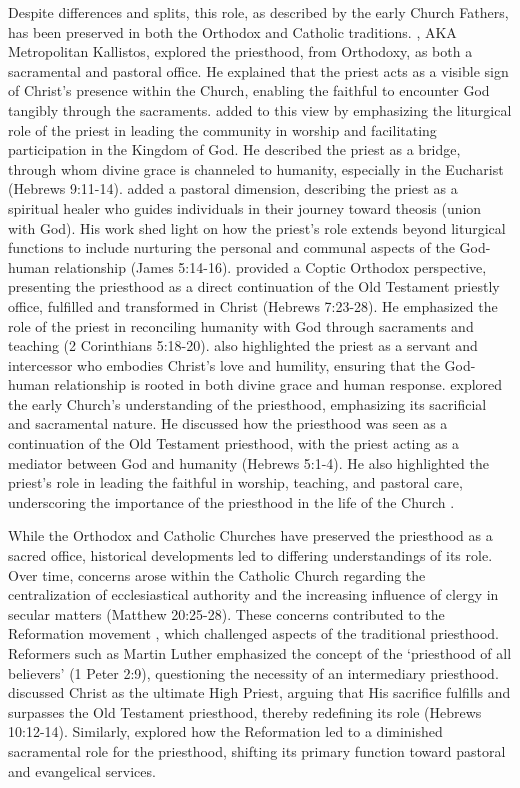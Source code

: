\documentclass[12pt, doc]{apa7}   	%
\begin{document}
Despite differences and splits, this role, as described by the early Church Fathers, has been preserved in both the Orthodox and Catholic traditions.  \citet{orthodox_church_ware}, AKA Metropolitan Kallistos, explored the priesthood, from Orthodoxy, as both a sacramental and pastoral office. He explained that the priest acts as a visible sign of Christ’s presence within the Church, enabling the faithful to encounter God tangibly through the sacraments. \citet{eucharist_schmemann} added to this view by emphasizing the liturgical role of the priest in leading the community in worship and facilitating participation in the Kingdom of God. He described the priest as a bridge, through whom divine grace is channeled to humanity, especially in the Eucharist (Hebrews 9:11-14). \citet{priests_zacharias} added a pastoral dimension, describing the priest as a spiritual healer who guides individuals in their journey toward theosis (union with God). His work shed light on how the priest’s role extends beyond liturgical functions to include nurturing the personal and communal aspects of the God-human relationship (James 5:14-16).  \citet{priesthood_shenouda} provided a Coptic Orthodox perspective, presenting the priesthood as a direct continuation of the Old Testament priestly office, fulfilled and transformed in Christ (Hebrews 7:23-28). He emphasized the role of the priest in reconciling humanity with God through sacraments and teaching (2 Corinthians 5:18-20). \citet{priesthood_shenouda} also highlighted the priest as a servant and intercessor who embodies Christ’s love and humility, ensuring that the God-human relationship is rooted in both divine grace and human response.  \citet{early_church_akin} explored the early Church’s understanding of the priesthood, emphasizing its sacrificial and sacramental nature. He discussed how the priesthood was seen as a continuation of the Old Testament priesthood, with the priest acting as a mediator between God and humanity (Hebrews 5:1-4). He also highlighted the priest’s role in leading the faithful in worship, teaching, and pastoral care, underscoring the importance of the priesthood in the life of the Church \citep{early_church_akin}.

While the Orthodox and Catholic Churches have preserved the priesthood as a sacred office, historical developments led to differing understandings of its role. Over time, concerns arose within the Catholic Church regarding the centralization of ecclesiastical authority and the increasing influence of clergy in secular matters (Matthew 20:25-28). These concerns contributed to the Reformation movement \citep{reformation_lutzer}, which challenged aspects of the traditional priesthood.  Reformers such as Martin Luther \citep{reformation_lull_nelson} emphasized the concept of the ‘priesthood of all believers’ (1 Peter 2:9), questioning the necessity of an intermediary priesthood. \citet{hebrews_wright} discussed Christ as the ultimate High Priest, arguing that His sacrifice fulfills and surpasses the Old Testament priesthood, thereby redefining its role (Hebrews 10:12-14). Similarly, \citet{reformation_macCulloch} explored how the Reformation led to a diminished sacramental role for the priesthood, shifting its primary function toward pastoral and evangelical services.
\end{document}

